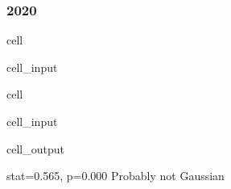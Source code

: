 \documentclass[letterpaper,10pt,english]{jupyterBook}
\begin{document}
\subsubsection{2020}
\label{\detokenize{notebooks/testing_malaysian_paper:id2}}
\begin{sphinxuseclass}{cell}\begin{sphinxVerbatimInput}

\begin{sphinxuseclass}{cell_input}
\begin{sphinxVerbatim}[commandchars=\\\{\}]
  \PYG{p}{[}\PYG{p}{]}
\end{sphinxVerbatim}

\end{sphinxuseclass}\end{sphinxVerbatimInput}

\end{sphinxuseclass}
\begin{sphinxuseclass}{cell}\begin{sphinxVerbatimInput}

\begin{sphinxuseclass}{cell_input}
\begin{sphinxVerbatim}[commandchars=\\\{\}]
  
   
   
\end{sphinxVerbatim}

\end{sphinxuseclass}\end{sphinxVerbatimInput}
\begin{sphinxVerbatimOutput}

\begin{sphinxuseclass}{cell_output}
\begin{sphinxVerbatim}[commandchars=\\\{\}]
stat=0.565, p=0.000
Probably not Gaussian
\end{sphinxVerbatim}

\end{sphinxuseclass}\end{sphinxVerbatimOutput}

\end{sphinxuseclass}
\end{document}
